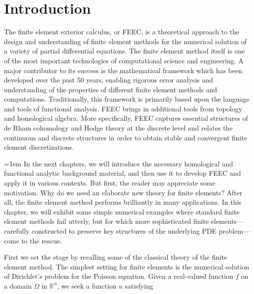 \clearpage\setcounter{section}{0}
\section{{Introduction}}\label{chap:introduction}

{The finite element exterior calculus, or FEEC, is a theoretical approach to the design and understanding of finite element methods for the numerical solution of a variety of partial differential equations. The finite element method itself is one of the most important technologies of computational science and engineering. A major contributor to its success is the mathematical framework which has been developed over the past 50 years, enabling rigorous error analysis and understanding of the properties of different finite element methods and computations. Traditionally, this framework is primarily based upon the language and tools of functional analysis. FEEC brings in additional tools from topology and homological algebra. More specifically, FEEC captures essential structures of de Rham cohomology and Hodge theory at the discrete level and relates the continuous and discrete structures in order to obtain stable and convergent finite element discretizations.}

{\emergencystretch=1em
{In the next chapters, we will introduce the necessary homological and functional analytic background material, and then use it to develop FEEC and apply it in various contexts. But first, the reader may appreciate some motivation. Why do we need an elaborate new theory for finite elements? After all, the finite element method performs brilliantly in many applications. In this chapter, we will exhibit some simple numerical examples where standard finite element methods fail utterly, but for which more sophisticated finite elements---carefully constructed to preserve key structures of the underlying PDE problem---come to the rescue.}
\par}

{First we set the stage by recalling some of the classical theory of the finite element method. The simplest setting for finite elements is the numerical solution of Dirichlet's problem for the Poisson equation. Given a real-valued function $f$ on a domain $\Omega$ in $\mathbb R^n$, we seek a function $u$ satisfying}

